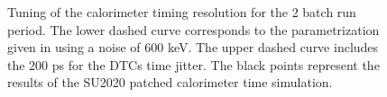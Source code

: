 \begin{figure}[h]
  \hspace{-0.6in}
  \caption{
    \label{fig:calorimeter_timing_resolution_2batch}
    Tuning of {\blue the} calorimeter timing resolution for the 2 batch run period. The lower dashed curve corresponds to the parametrization
    given in \cite{MU2E_36225_CALO_TIME_RES}  {\blue using} a noise of 600 keV. The upper dashed curve includes the 200 ps for the DTCs
    time  {\blue jitter}. The black points represent the result{\blue s} of the SU2020 patched calorimeter time simulation. 
  }
\end{figure}
